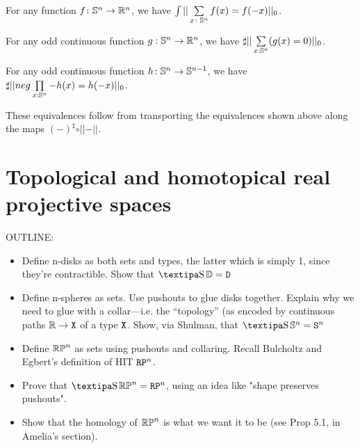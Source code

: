 \documentclass{amsart}
\begin{document}
\begin{statement}\label{BUClassic-RCHoTT}
  For any function $f \colon \mathbb{S}^n \to \mathbb{R}^n$, we have
  $\int \vert\vert \sum\limits_{x \colon \mathbb{S}^n} f(x) = f(-x) \vert\vert_0$.
\end{statement}

\begin{statement}\label{BUOdd-RCHoTT}
  For any odd continuous function $g: \mathbb{S}^n \rightarrow \mathbb{R}^n$, we
  have
  $\sharp \vert\vert\sum\limits_{x : \mathbb{S}^n} (g(x) = 0) \vert\vert_0$.
\end{statement}

\begin{statement}\label{BURetract-RCHoTT}
  For any odd continuous function $h \colon \mathbb{S}^n \to \mathbb{S}^{n-1}$, we
  have
  $\sharp \vert\vert neg \prod\limits_{x : \mathbb{S}^n} -h(x) = h(-x)
  \vert\vert_0$.
\end{statement}

These equivalences follow from transporting the equivalences shown
above along the maps $(-)^\sharp \circ \vert\vert - \vert\vert$.  


\section{Topological and homotopical real projective spaces}
\label{sec:rpn}

OUTLINE:
\begin{itemize}
\item
  Define n-disks as both sets and types, the latter which is
  simply 1, since they're contractible. Show that $ \shape
  \DD = \D $ 
\item
  Define n-spheres as sets.  Use pushouts to glue
  disks together. Explain why we need to glue with a
  collar---i.e. the ``topology'' (as encoded by continuous
  paths $ \mathbb{R} \to \mathtt{X} $ of a type $ \mathtt{X} $. Show, via Shulman,
  that $ \shape \SS^n = \S^n $ 
\item
  Define $ \mathbb{RP}^n $ as sets using pushouts and collaring.
  Recall Bulcholtz and Egbert's definition of HIT $ \mathtt{RP}^n
  $. 
 \item
  Prove that $ \shape \set{RP}^n = \RP^n $, using an idea like "shape preserves pushouts".
\item
Show that the homology of $\mathbb{RP}^n$ is what we want it to be (see Prop 5.1, in Amelia's section).
\end{itemize}
\end{document}
